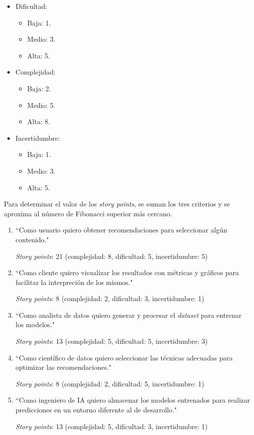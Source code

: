 \documentclass[
11pt, %
]{charter}
\begin{document}
\begin{itemize}
	\item Dificultad:
		\begin{itemize}
			\item Baja: 1.
			\item Medio: 3.
			\item Alta: 5.
		\end{itemize}
	\item Complejidad:
		\begin{itemize}
			\item Baja: 2.
			\item Medio: 5.
			\item Alta: 8.
		\end{itemize}
	\item Incertidumbre:
		\begin{itemize}
			\item Baja: 1.
			\item Medio: 3.
			\item Alta: 5.
		\end{itemize}
\end{itemize}

Para determinar el valor de los \textit{story points}, se suman los tres criterios y se aproxima al número de Fibonacci superior más cercano.


\begin{enumerate}
\item ``Como usuario quiero obtener recomendaciones para seleccionar algún contenido."

\textit{Story points}: 21 (complejidad: 8, dificultad: 5, incertidumbre: 5)

\item ``Como cliente quiero visualizar los resultados con métricas y gráficos para facilitar la interpreción de los mismos."

\textit{Story points}: 8 (complejidad: 2, dificultad: 3, incertidumbre: 1)

\item ``Como analista de datos quiero generar y procesar el \textit{dataset} para entrenar los modelos."

\textit{Story points}: 13 (complejidad: 5, dificultad: 5, incertidumbre: 3)

\item ``Como científico de datos quiero seleccionar las técnicas adecuadas para optimizar las recomendaciones."

\textit{Story points}: 8 (complejidad: 2, dificultad: 5, incertidumbre: 1)

\item ``Como ingeniero de IA quiero almacenar los modelos entrenados para realizar predicciones en un entorno diferente al de desarrollo."

\textit{Story points}: 13 (complejidad: 5, dificultad: 3, incertidumbre: 1)
\end{enumerate}
\end{document}
